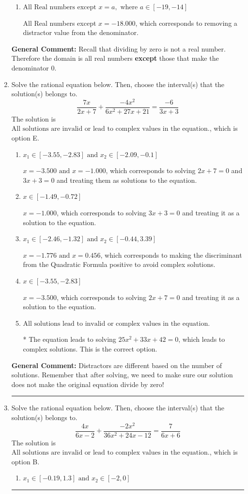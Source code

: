 \documentclass{extbook}[14pt]
\newcommand{\litem}[1]{\item #1

\rule{\textwidth}{0.4pt}}
\begin{document}
\begin{enumerate}
{\begin{enumerate}[label=\Alph*.]
All Real numbers except $x = -2.000$ and $x = 0.600$, which is the correct option.
\item \( \text{All Real numbers except } x = a, \text{ where } a \in [-19, -14] \)

All Real numbers except $x = -18.000$, which corresponds to removing a distractor value from the denominator.
\end{enumerate}

\textbf{General Comment:} Recall that dividing by zero is not a real number. Therefore the domain is all real numbers \textbf{except} those that make the denominator 0.
}
\litem{
Solve the rational equation below. Then, choose the interval(s) that the solution(s) belongs to.
\[ \frac{7x}{2x + 7} + \frac{-4x^{2}}{6x^{2} +27 x + 21} = \frac{-6}{3x + 3} \]The solution is \( \text{All solutions are invalid or lead to complex values in the equation.} \), which is option E.\begin{enumerate}[label=\Alph*.]
\item \( x_1 \in [-3.55, -2.83] \text{ and } x_2 \in [-2.09,-0.1] \)

$x = -3.500 \text{ and } x = -1.000$, which corresponds to solving $2x + 7 = 0$ and $3x + 3 = 0$ and treating them as solutions to the equation.
\item \( x \in [-1.49,-0.72] \)

$x = -1.000$, which corresponds to solving $3x + 3 = 0$ and treating it as a solution to the equation.
\item \( x_1 \in [-2.46, -1.32] \text{ and } x_2 \in [-0.44,3.39] \)

$x = -1.776 \text{ and } x = 0.456$, which corresponds to making the discriminant from the Quadratic Formula positive to avoid complex solutions.
\item \( x \in [-3.55,-2.83] \)

$x = -3.500$, which corresponds to solving $2x + 7 = 0$ and treating it as a solution to the equation.
\item \( \text{All solutions lead to invalid or complex values in the equation.} \)

* The equation leads to solving $25x^{2} +33 x + 42=0$, which leads to complex solutions. This is the correct option.
\end{enumerate}

\textbf{General Comment:} Distractors are different based on the number of solutions. Remember that after solving, we need to make sure our solution does not make the original equation divide by zero!
}
\litem{
Solve the rational equation below. Then, choose the interval(s) that the solution(s) belongs to.
\[ \frac{4x}{6x -2} + \frac{-2x^{2}}{36x^{2} +24 x -12} = \frac{7}{6x + 6} \]The solution is \( \text{All solutions are invalid or lead to complex values in the equation.} \), which is option B.\begin{enumerate}[label=\Alph*.]
\item \( x_1 \in [-0.19, 1.3] \text{ and } x_2 \in [-2,0] \)


\end{enumerate}}
\end{enumerate}
\end{document}
